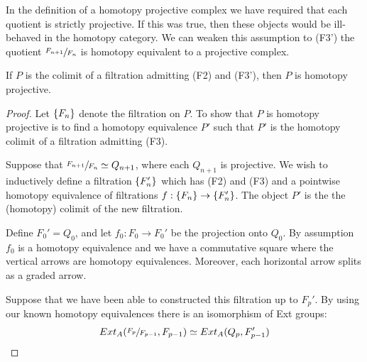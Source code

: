 \documentclass[../thesis.tex]{subfiles}
\begin{document}
            In the definition of a homotopy projective complex we have required that each quotient is strictly projective. If this was true, then these objects would be ill-behaved in the homotopy category. We can weaken this assumption to (F3') the quotient $\sfrac{F_{n+1}}{F_n}$ is homotopy equivalent to a projective complex.

            \begin{lemma}\label{lem: homo-proj-homo-well-def}
                If $P$ is the colimit of a filtration admitting (F2) and (F3'), then $P$ is homotopy projective.
            \end{lemma}

            \begin{proof}
                Let $\{F_n\}$ denote the filtration on $P$. To show that $P$ is homotopy projective is to find a homotopy equivalence $P'$ such that $P'$ is the homotopy colimit of a filtration admitting (F3).

                Suppose that $\sfrac{F_{n+1}}{F_n}\simeq Q_{n+1}$, where each $Q_{n+1}$ is projective. We wish to inductively define a filtration $\{F_n'\}$ which has (F2) and (F3) and a pointwise homotopy equivalence of filtrations $f : \{F_n\} \rightarrow \{F_n'\}$. The object $P'$ is the the (homotopy) colimit of the new filtration.
                
                Define $F_0' = Q_0$, and let $f_0 : F_0 \rightarrow F_0'$ be the projection onto $Q_0$. By assumption $f_0$ is a homotopy equivalence and we have a commutative square where the vertical arrows are homotopy equivalences. Moreover, each horizontal arrow splits as a graded arrow.

                \begin{center}
                \end{center}

                Suppose that we have been able to constructed this filtration up to $F_p'$. By using our known homotopy equivalences there is an isomorphism of Ext groups:
                \begin{align*}
                    Ext_A(\sfrac{F_{p}}{F_{p-1}}, F_{p-1})\simeq Ext_A(Q_p, F_{p-1}')
                \end{align*}


\end{proof}
\end{document}
